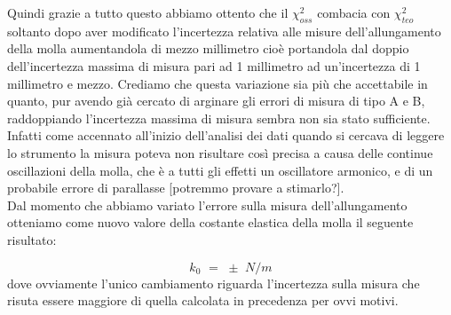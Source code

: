Quindi grazie a tutto questo abbiamo ottento che il $\chi_{oss}^2$ combacia con $\chi_{teo}^2$ soltanto dopo aver modificato l'incertezza relativa alle misure dell'allungamento della molla aumentandola di mezzo millimetro cioè portandola dal doppio dell'incertezza massima di misura pari ad 1 millimetro ad un'incertezza di 1 millimetro e mezzo. Crediamo che questa variazione sia più che accettabile in quanto, pur avendo già cercato di arginare gli errori di misura di tipo A e B, raddoppiando l'incertezza massima di misura sembra non sia stato sufficiente. Infatti come accennato all'inizio dell'analisi dei dati quando si cercava di leggere lo strumento la misura poteva non risultare così precisa a causa delle continue oscillazioni della molla, che è a tutti gli effetti un oscillatore armonico, e di un probabile errore di parallasse [potremmo provare a stimarlo?].\\
Dal momento che abbiamo variato l'errore sulla misura dell'allungamento otteniamo come nuovo valore della costante elastica della molla il seguente risultato:

\begin{equation*}
	k_0 \,\,=\,\,  \pm  \,\, N/m
\end{equation*}
%
dove ovviamente l'unico cambiamento riguarda l'incertezza sulla misura che risuta essere maggiore di quella calcolata in precedenza per ovvi motivi.

